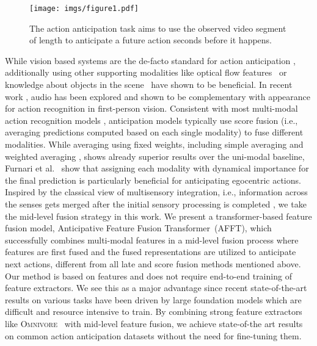 \documentclass[10pt,twocolumn,letterpaper,dvipsnames]{article}
\newcommand{\sname}{AFFT}
\newcommand{\lname}{Anticipative Feature Fusion Transformer}
\newcommand{\lsname}{\lname\ (\sname)}
\begin{document}
\begin{figure}[t]
  \hspace*{-0.2cm}\texttt{[image: imgs/figure1.pdf]}
  \caption{The action anticipation task aims to use the observed video segment of length  to anticipate a future action  seconds before it happens.}
  \label{fig:intro}
\end{figure}
While vision based systems are the de-facto standard for action anticipation \cite{furnariWhatWouldYou2019, girdharAnticipativeVideoTransformer2021, wuMeMViTMemoryAugmentedMultiscale2022}, additionally using other supporting modalities like optical flow features~\cite{wangTemporalSegmentNetworks2016,carreiraQuoVadisAction2017,kazakosEPICFusionAudioVisualTemporal2019} or knowledge about objects in the scene~\cite{furnari2017next} have shown to be beneficial.
In recent work \cite{kazakosEPICFusionAudioVisualTemporal2019,kazakosLittleHelpMy2021,nagraniAttentionBottlenecksMultimodal2021}, audio has been explored and shown to be complementary with appearance for action recognition in first-person vision. 
Consistent with most multi-modal action recognition models \cite{wangTemporalSegmentNetworks2016,carreiraQuoVadisAction2017}, anticipation models typically use score fusion (i.e., averaging predictions computed based on each single modality) to fuse different modalities. While averaging using fixed weights, including simple averaging \cite{senerTemporalAggregateRepresentations2020} and weighted averaging \cite{girdharAnticipativeVideoTransformer2021}, shows already superior results over the uni-modal baseline, Furnari et al.~\cite{furnariWhatWouldYou2019} show that assigning each modality with dynamical importance for the final prediction is particularly beneficial for anticipating egocentric actions. 
Inspired by the classical view of multisensory integration, i.e., information across the senses gets merged after the initial sensory processing is completed \cite{bloom1988brain,talsma2015predictive}, we take the mid-level fusion strategy in this work.
We present a transformer-based feature fusion model, \lsname, which successfully combines multi-modal features in a mid-level fusion process where features are first fused and the fused representations are utilized to anticipate next actions, different from all late and score fusion methods mentioned above. 
Our method is based on features and does not require end-to-end training of feature extractors. We see this as a major advantage since recent state-of-the-art results on various tasks have been driven by large foundation models which are difficult and resource intensive to train.
By combining strong feature extractors like \textsc{Omnivore}~\cite{girdharOmnivoreSingleModel2022} with mid-level feature fusion, we achieve state-of-the art results on common action anticipation datasets without the need for fine-tuning them.
\end{document}
